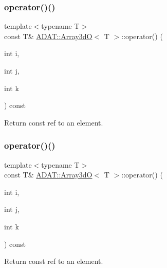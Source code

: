 \subsubsection{\texorpdfstring{operator()()}{operator()()}\hspace{0.1cm}{\footnotesize\ttfamily [4/6]}}
{\footnotesize\ttfamily template$<$typename T$>$ \\
const T\& \mbox{\hyperlink{classADAT_1_1Array3dO}{A\+D\+A\+T\+::\+Array3dO}}$<$ T $>$\+::operator() (\begin{DoxyParamCaption}\item[{int}]{i,  }\item[{int}]{j,  }\item[{int}]{k }\end{DoxyParamCaption}) const\hspace{0.3cm}{\ttfamily [inline]}}



Return const ref to an element. 

\mbox{\label{classADAT_1_1Array3dO_a3b4254a3812d8a02c4510f4fa635dd9c}} 
\subsubsection{\texorpdfstring{operator()()}{operator()()}\hspace{0.1cm}{\footnotesize\ttfamily [5/6]}}
{\footnotesize\ttfamily template$<$typename T$>$ \\
const T\& \mbox{\hyperlink{classADAT_1_1Array3dO}{A\+D\+A\+T\+::\+Array3dO}}$<$ T $>$\+::operator() (\begin{DoxyParamCaption}\item[{int}]{i,  }\item[{int}]{j,  }\item[{int}]{k }\end{DoxyParamCaption}) const\hspace{0.3cm}{\ttfamily [inline]}}



Return const ref to an element. 

\mbox{\label{classADAT_1_1Array3dO_a3b4254a3812d8a02c4510f4fa635dd9c}} 
